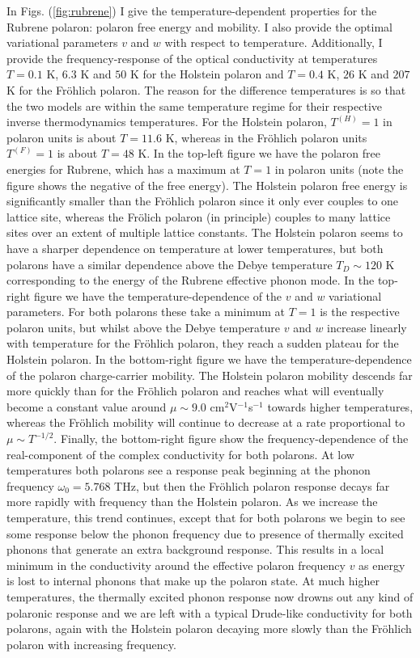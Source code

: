 In Figs. (\ref{fig:rubrene}) I give the temperature-dependent properties for the Rubrene polaron: polaron free energy and mobility. I also provide the optimal variational parameters $v$ and $w$ with respect to temperature.  Additionally, I provide the frequency-response of the optical conductivity at temperatures $T = 0.1$ K, $6.3$ K and $50$ K for the Holstein polaron and $T = 0.4$ K, $26$ K and $207$ K for the Fr\"ohlich polaron. The reason for the difference temperatures is so that the two models are within the same temperature regime for their respective inverse thermodynamics temperatures. For the Holstein polaron, $T^{(H)} = 1$ in polaron units is about $T = 11.6$ K, whereas in the Fr\"ohlich polaron units $T^{(F)} = 1$ is about $T = 48$ K. In the top-left figure we have the polaron free energies for Rubrene, which has a maximum at $T = 1$ in polaron units (note the figure shows the negative of the free energy). The Holstein polaron free energy is significantly smaller than the Fr\"ohlich polaron since it only ever couples to one lattice site, whereas the Fr\"olich polaron (in principle) couples to many lattice sites over an extent of multiple lattice constants. The Holstein polaron seems to have a sharper dependence on temperature at lower temperatures, but both polarons have a similar dependence above the Debye temperature $T_D \sim 120$ K corresponding to the energy of the Rubrene effective phonon mode. In the top-right figure we have the temperature-dependence of the $v$ and $w$ variational parameters. For both polarons these take a minimum at $T=1$ is the respective polaron units, but whilst above the Debye temperature $v$ and $w$ increase linearly with temperature for the Fr\"ohlich polaron, they reach a sudden plateau for the Holstein polaron. In the bottom-right figure we have the temperature-dependence of the polaron charge-carrier mobility. The Holstein polaron mobility descends far more quickly than for the Fr\"ohlich polaron and reaches what will eventually become a constant value around $\mu \sim 9.0$ cm$^2$V$^{-1}$s$^{-1}$ towards higher temperatures, whereas the Fr\"ohlich mobility will continue to decrease at a rate proportional to $\mu \sim T^{-1/2}$. Finally, the bottom-right figure show the frequency-dependence of the real-component of the complex conductivity for both polarons. At low temperatures both polarons see a response peak beginning at the phonon frequency $\omega_0 = 5.768$ THz, but then the Fr\"ohlich polaron response decays far more rapidly with frequency than the Holstein polaron. As we increase the temperature, this trend continues, except that for both polarons we begin to see some response below the phonon frequency due to presence of thermally excited phonons that generate an extra background response. This results in a local minimum in the conductivity around the effective polaron frequency $v$ as energy is lost to internal phonons that make up the polaron state. At much higher temperatures, the thermally excited phonon response now drowns out any kind of polaronic response and we are left with a typical Drude-like conductivity for both polarons, again with the Holstein polaron decaying more slowly than the Fr\"ohlich polaron with increasing frequency.
\newline

